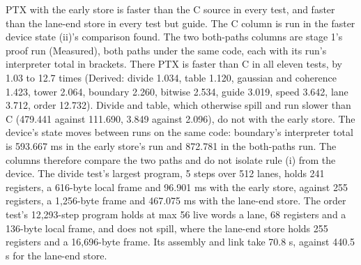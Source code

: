 \begin{enumerate}
\begin{itemize}
\begin{enumerate}
\begin{itemize}
PTX with the early store is faster than the C source in every test, and faster than the lane-end store in every test but guide. The C column is run in the faster device state (ii)'s comparison found. The two both-paths columns are stage 1's proof run (Measured), both paths under the same code, each with its run's interpreter total in brackets. There PTX is faster than C in all eleven tests, by 1.03 to 12.7 times (Derived: divide 1.034, table 1.120, gaussian and coherence 1.423, tower 2.064, boundary 2.260, bitwise 2.534, guide 3.019, speed 3.642, lane 3.712, order 12.732). Divide and table, which otherwise spill and run slower than C (479.441 against 111.690, 3.849 against 2.096), do not with the early store. The device's state moves between runs on the same code: boundary's interpreter total is 593.667 ms in the early store's run and 872.781 in the both-paths run. The columns therefore compare the two paths and do not isolate rule (i) from the device. The divide test's largest program, 5 steps over 512 lanes, holds 241 registers, a 616-byte local frame and 96.901 ms with the early store, against 255 registers, a 1,256-byte frame and 467.075 ms with the lane-end store. The order test's 12,293-step program holds at max 56 live words a lane, 68 registers and a 136-byte local frame, and does not spill, where the lane-end store holds 255 registers and a 16,696-byte frame. Its assembly and link take 70.8 s, against 440.5 s for the lane-end store.


\end{itemize}
\end{enumerate}
\end{itemize}
\end{enumerate}
